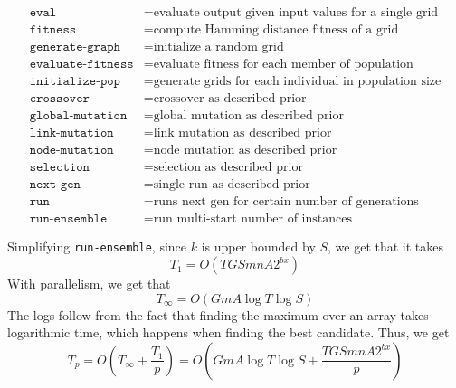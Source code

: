 \documentclass{article}
\begin{document}
	\begin{align*}
	\texttt{eval} &= \text{evaluate output given input values for a single grid} \\
	\texttt{fitness} &= \text{compute Hamming distance fitness of a grid}\\
	\texttt{generate-graph} &= \text{initialize a random grid}\\
	\texttt{evaluate-fitness} &= \text{evaluate fitness for each member of population}\\
	\texttt{initialize-pop} &= \text{generate grids for each individual in population size}\\
	\texttt{crossover} &= \text{crossover as described prior}\\
	\texttt{global-mutation} &= \text{global mutation as described prior}\\
	\texttt{link-mutation} &= \text{link mutation as described prior}\\
	\texttt{node-mutation} &= \text{node mutation as described prior}\\
	\texttt{selection} &= \text{selection as described prior} \\
	\texttt{next-gen} &= \text{single run as described prior} \\
	\texttt{run} &= \text{runs next gen for certain number of generations} \\
	\texttt{run-ensemble} &= \text{run multi-start number of instances}
	\end{align*}

	Simplifying \texttt{run-ensemble}, since $k$ is upper bounded by $S$, we get that it takes $$T_1 = O(TGSmnA2^{bx})$$ With parallelism, we get that $$T_\infty = O(GmA\log T \log S)$$
	The logs follow from the fact that finding the maximum over an array takes logarithmic time, which happens when finding the best candidate. Thus, we get
	$$T_p = O\left(T_\infty + \frac{T_1}{p}\right) = O\left(GmA\log T \log S + \frac{TGSmnA2^{bx}}{p}\right)$$
	
\end{document}
